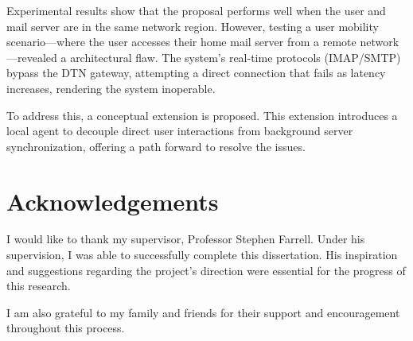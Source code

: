 \documentclass[a4paper,oneside,12pt]{book}
\begin{document}
Experimental results show that the proposal performs well when the user and mail server are in the same network region. However, testing a user mobility scenario—where the user accesses their home mail server from a remote network—revealed a architectural flaw. The system's real-time protocols (IMAP/SMTP) bypass the DTN gateway, attempting a direct connection that fails as latency increases, rendering the system inoperable.

To address this, a conceptual extension is proposed. This extension introduces a local agent to decouple direct user interactions from background server synchronization, offering a path forward to resolve the issues.

\newpage
\raggedright %

\section*{\Huge{Acknowledgements}}
I would like to thank my supervisor, Professor Stephen Farrell. Under his supervision, I was able to successfully complete this dissertation. His inspiration and suggestions regarding the project's direction were essential for the progress of this research.

I am also grateful to my family and friends for their support and encouragement throughout this process.
\newpage \tableofcontents
\newpage \listoffigures
\newpage \listoftables
\end{document}

